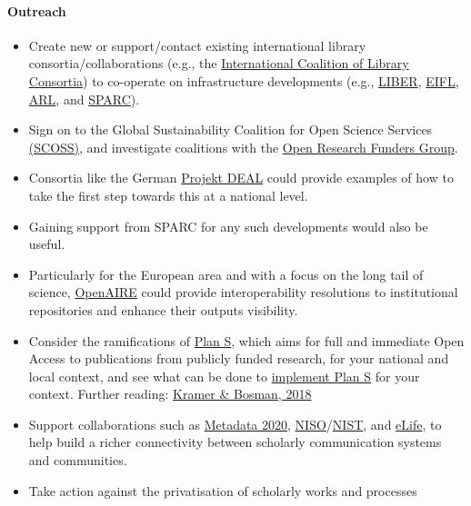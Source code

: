 \paragraph{Outreach}\label{outreach-3}

\begin{itemize}
\item
  Create new or support/contact existing international library
  consortia/collaborations (e.g., the
  \href{http://icolc.net/}{International Coalition of Library
  Consortia}) to co-operate on infrastructure developments (e.g.,
  \href{https://libereurope.eu/}{LIBER},
  \href{http://www.eifl.net/}{EIFL}, \href{http://www.arl.org/}{ARL},
  and \href{https://sparcopen.org/}{SPARC}).
\item
  Sign on to the Global Sustainability Coalition for Open Science
  Services \href{http://scoss.org/}{(SCOSS)}, and investigate coalitions
  with the \href{http://www.orfg.org}{Open Research Funders Group}.
\item
  Consortia like the German \href{https://www.projekt-deal.de/}{Projekt
  DEAL} could provide examples of how to take the first step towards
  this at a national level.
\item
  Gaining support from SPARC for any such developments would also be
  useful.
\item
  Particularly for the European area and with a focus on the long tail
  of science, \href{https://www.openaire.eu/}{OpenAIRE} could provide
  interoperability resolutions to institutional repositories and enhance
  their outputs visibility.
\item
  Consider the ramifications of
  \href{https://www.coalition-s.org/about/}{Plan S}, which aims for full
  and immediate Open Access to publications from publicly funded
  research, for your national and local context, and see what can be
  done to
  \href{https://www.coalition-s.org/wp-content/uploads/271118_cOAlitionS_Guidance.pdf}{implement
  Plan S} for your context. Further reading:
  \href{https://101innovations.wordpress.com/2018/11/30/nine-routes-towards-plan-s-compliance/}{Kramer
  \& Bosman, 2018}
\item
  Support collaborations such as
  \href{http://www.metadata2020.org/}{Metadata 2020},
  \href{https://www.niso.org/}{NISO}/\href{https://www.nist.gov/}{NIST},
  and \href{https://elifesciences.org/}{eLife}, to help build a richer
  connectivity between scholarly communication systems and communities.
\item
  Take action against the privatisation of scholarly works and processes

\end{itemize}
